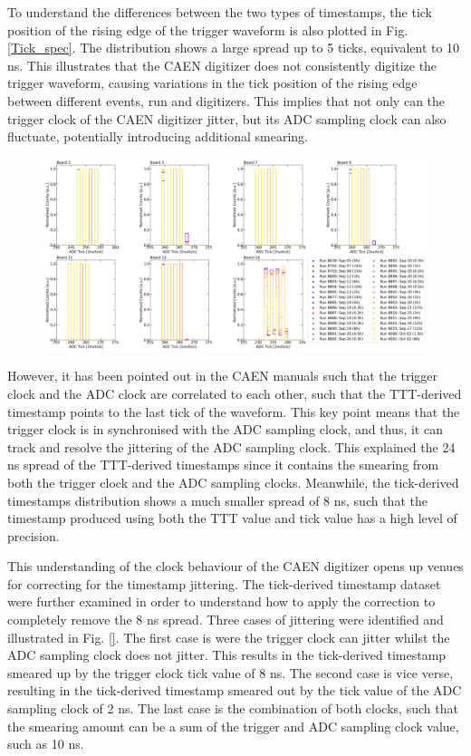 To understand the differences between the two types of timestamps, the tick position of the rising edge of the trigger waveform is also plotted in Fig. \ref {Tick_spec}.
The distribution shows a large spread up to 5 ticks, equivalent to 10 ns.
This illustrates that the CAEN digitizer does not consistently digitize the trigger waveform, causing variations in the tick position of the rising edge between different events, run and digitizers.
This implies that not only can the trigger clock of the CAEN digitizer jitter, but its ADC sampling clock can also fluctuate, potentially introducing additional smearing.

\begin{figure}[htbp!]
\centering    
\includegraphics[width=\linewidth]{Tick_spec}
\caption{}
\label{fig:Tick_spec}
\end{figure}

However, it has been pointed out in the CAEN manuals such that the trigger clock and the ADC clock are correlated to each other, such that the TTT-derived timestamp points to the last tick of the waveform.
This key point means that the trigger clock is in synchronised with the ADC sampling clock, and thus, it can track and resolve the jittering of the ADC sampling clock.
This explained the 24 ns spread of the TTT-derived timestamps since it contains the smearing from both the trigger clock and the ADC sampling clocks.
Meanwhile, the tick-derived timestamps distribution shows a much smaller spread of 8 ns, such that the timestamp produced using both the TTT value and tick value has a high level of precision.

This understanding of the clock behaviour of the CAEN digitizer opens up venues for correcting for the timestamp jittering.
The tick-derived timestamp dataset were further examined in order to understand how to apply the correction to completely remove the 8 ns spread.
Three cases of jittering were identified and illustrated in Fig. \ref{}.
The first case is were the trigger clock can jitter whilst the ADC sampling clock does not jitter.
This results in the tick-derived timestamp smeared up by the trigger clock tick value of 8 ns.
The second case is vice verse, resulting in the tick-derived timestamp smeared out by the tick value of the ADC sampling clock of 2 ns.
The last case is the combination of both clocks, such that the smearing amount can be a sum of the trigger and ADC sampling clock value, such as 10 ns.

